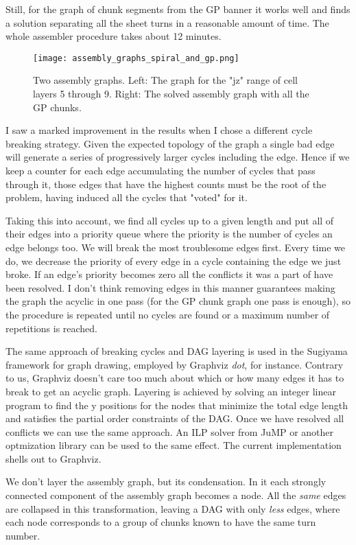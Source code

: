 \documentclass{article}
\begin{document}
Still, for the graph of chunk segments from the GP banner it works well and finds a solution separating all the sheet turns in a reasonable amount of time. The whole assembler procedure takes about 12 minutes.

\begin{figure}
    \centering
    \texttt{[image: assembly\_graphs\_spiral\_and\_gp.png]}
    \caption{Two assembly graphs. Left: The graph for the "jz" range of cell layers 5 through 9. Right: The solved assembly graph with all the GP chunks.}
    \label{spiral-graph}
\end{figure}

I saw a marked improvement in the results when I chose a different cycle breaking strategy. Given the expected topology of the graph a single bad edge will generate a series of progressively larger cycles including the edge. Hence if we keep a counter for each edge accumulating the number of cycles that pass through it, those edges that have the highest counts must be the root of the problem, having induced all the cycles that "voted" for it.

Taking this into account, we find all cycles up to a given length and put all of their edges into a priority queue where the priority is the number of cycles an edge belongs too. We will break the most troublesome edges first. Every time we do, we decrease the priority of every edge in a cycle containing the edge we just broke. If an edge's priority becomes zero all the conflicts it was a part of have been resolved. I don't think removing edges in this manner guarantees making the graph the acyclic in one pass (for the GP chunk graph one pass is enough), so the procedure is repeated until no cycles are found or a maximum number of repetitions is reached.

The same approach of breaking cycles and DAG layering is used in the Sugiyama framework for graph drawing, employed by Graphviz \emph{dot}, for instance. Contrary to us, Graphviz doesn't care too much about which or how many edges it has to break to get an acyclic graph. Layering is achieved by solving an integer linear program to find the y positions for the nodes that minimize the total edge length and satisfies the partial order constraints of the DAG. Once we have resolved all conflicts we can use the same approach. An ILP solver from JuMP or another optmization library can be used to the same effect. The current implementation shells out to Graphviz.

We don't layer the assembly graph, but its condensation. In it each strongly connected component of the assembly graph becomes a node. All the \emph{same} edges are collapsed in this transformation, leaving a DAG with only \emph{less} edges, where each node corresponds to a group of chunks known to have the same turn number.
\end{document}
